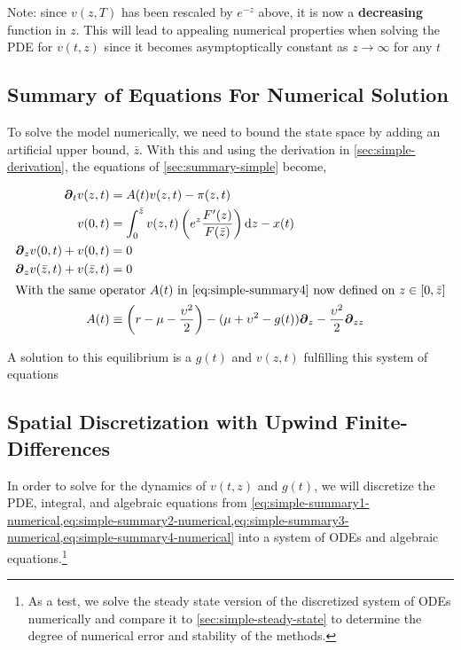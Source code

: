 \documentclass[11pt]{article}
\newcommand{\D}[1][]{\ensuremath{\boldsymbol{\partial}_{#1}}}
\newcommand{\diff}{\ensuremath{\mathrm{d}}}
\begin{document}
Note: since $v(z,T)$ has been rescaled by $e^{-z}$ above, it is now a \textbf{decreasing} function in $z$.  This will lead to appealing numerical properties when solving the PDE for $v(t,z)$ since it becomes asymptoptically constant as $z \to \infty$ for any $t$


\subsection{Summary of Equations For Numerical Solution}\label{sec:summary-simple-numerical}
To solve the model numerically, we need to bound the state space by adding an artificial upper bound, $\bar{z}$.  With this and using the derivation in \cref{sec:simple-derivation}, the equations of \cref{sec:summary-simple} become,

\begin{align}
\D[t]v(z,t) &= A(t)v(z,t) - \pi(z,t)\label{eq:simple-summary1-numerical}\\
v(0,t) &= \int_{0}^{\bar{z}}  v(z,t) \left(e^z \frac{F'(z)}{F(\bar{z})}\right) \diff z - x(t)\label{eq:simple-summary2-numerical}\\
\D[z]v(0,t) + v(0,t) &= 0\label{eq:simple-summary3-numerical}\\
\D[z]v(\bar{z},t) + v(\bar{z},t) &= 0\label{eq:simple-summary4-numerical}\\
\intertext{With the same operator $A(t)$ in \cref{eq:simple-summary4} now defined on $z \in [0,\bar{z}]$}
A(t) &\equiv \left(r - \mu - \frac{\upsilon^2}{2}\right) - (\mu+ \upsilon^2 - g(t)) \D[z] - \frac{\upsilon^2}{2} \D[zz]\label{eq:simple-summary5-numerical}
\end{align}

\noindent A solution to this equilibrium is a $g(t)$ and $v(z,t)$ fulfilling this system of equations

\subsection{Spatial Discretization with Upwind Finite-Differences}

In order to solve for the dynamics of $v(t,z)$ and $g(t)$, we will discretize the PDE, integral, and algebraic equations from \cref{eq:simple-summary1-numerical,eq:simple-summary2-numerical,eq:simple-summary3-numerical,eq:simple-summary4-numerical} into a system of ODEs and algebraic equations.\footnote{As a test, we solve the steady state version of the discretized system of ODEs numerically and compare it to \cref{sec:simple-steady-state} to determine the degree of numerical error and stability of the methods.}
\end{document}
